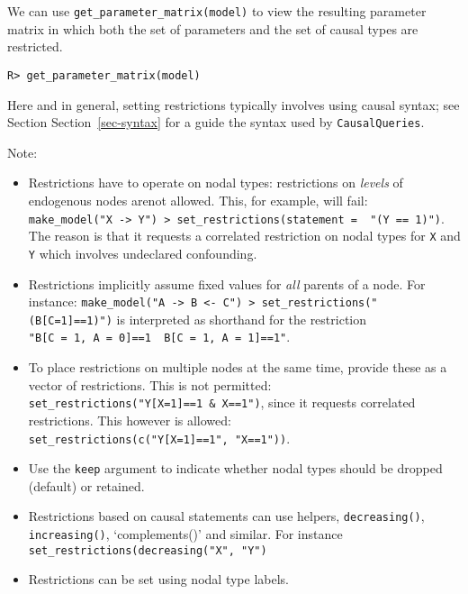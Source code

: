 \documentclass[
  11pt,
  article]{jss}
\providecommand{\tightlist}{%
  \setlength{\itemsep}{0pt}\setlength{\parskip}{0pt}}\usepackage{longtable,booktabs,array}
\begin{document}
\begin{table}

\end{table}

We can use \texttt{get\_parameter\_matrix(model)} to view the resulting
parameter matrix in which both the set of parameters and the set of
causal types are restricted.

\begin{verbatim}
R> get_parameter_matrix(model)
\end{verbatim}

Here and in general, setting restrictions typically involves using
causal syntax; see Section Section~\ref{sec-syntax} for a guide the
syntax used by \texttt{CausalQueries}.

Note:

\begin{itemize}
\tightlist
\item
  Restrictions have to operate on nodal types: restrictions on
  \emph{levels} of endogenous nodes arenot allowed. This, for example,
  will fail:
  \texttt{make\_model("X\ -\textgreater{}\ Y")\ \textbar{}\textgreater{}\ set\_restrictions(statement\ =\ \ "(Y\ ==\ 1)")}.
  The reason is that it requests a correlated restriction on nodal types
  for \texttt{X} and \texttt{Y} which involves undeclared confounding.
\item
  Restrictions implicitly assume fixed values for \emph{all} parents of
  a node. For instance:
  \texttt{make\_model("A\ -\textgreater{}\ B\ \textless{}-\ C")\ \textbar{}\textgreater{}\ set\_restrictions("(B{[}C=1{]}==1)")}
  is interpreted as shorthand for the restriction
  \texttt{"B{[}C\ =\ 1,\ A\ =\ 0{]}==1\ \textbar{}\ B{[}C\ =\ 1,\ A\ =\ 1{]}==1"}.
\item
  To place restrictions on multiple nodes at the same time, provide
  these as a vector of restrictions. This is not permitted:
  \texttt{set\_restrictions("Y{[}X=1{]}==1\ \&\ X==1")}, since it
  requests correlated restrictions. This however is allowed:
  \texttt{set\_restrictions(c("Y{[}X=1{]}==1",\ "X==1"))}.\\
\item
  Use the \texttt{keep} argument to indicate whether nodal types should
  be dropped (default) or retained.
\item
  Restrictions based on causal statements can use helpers,
  \texttt{decreasing()}, \texttt{increasing()}, `complements()' and
  similar. For instance \texttt{set\_restrictions(decreasing("X",\ "Y")}
\item
  Restrictions can be set using nodal type labels.
\end{itemize}
\end{document}
